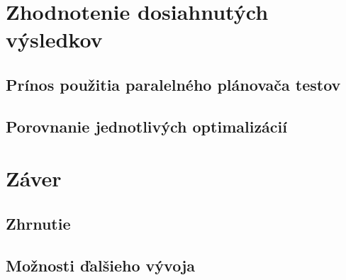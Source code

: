 \chapter{Zhodnotenie dosiahnutých výsledkov}
\section{Prínos použitia paralelného plánovača testov}
\section{Porovnanie jednotlivých optimalizácií}


\chapter{Záver}
\section{Zhrnutie}
\section{Možnosti ďalšieho vývoja}

